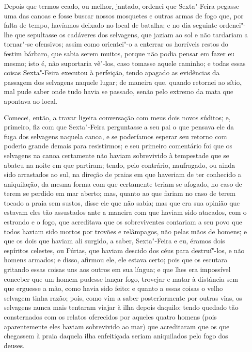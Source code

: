 Depois que termos ceado, ou melhor, jantado, ordenei que Sexta"-Feira
pegasse uma das canoas e fosse buscar nossos mosquetes e outras armas de
fogo que, por falta de tempo, havíamos deixado no local de batalha; e no
dia seguinte ordenei"-lhe que sepultasse os cadáveres dos selvagens, que
jaziam ao sol e não tardariam a tornar"-se ofensivos; assim como
orientei"-o a enterrar os horríveis restos do festim bárbaro, que sabia
serem muitos, porque não podia pensar em fazer eu mesmo; isto é, não
suportaria vê"-los, caso tomasse aquele caminho; e todas essas coisas
Sexta"-Feira executou à perfeição, tendo apagado as evidências da
passagem dos selvagens naquele lugar; de maneira que, quando retornei ao
sítio, mal pude saber onde tudo havia se passado, senão pelo extremo da
mata que apontava ao local.

Comecei, então, a travar ligeira conversação com meus dois novos
súditos; e, primeiro, fiz com que Sexta"-Feira perguntasse a seu pai o
que pensava ele da fuga dos selvagens naquela canoa, e se poderíamos
esperar seu retorno com poderio grande demais para resistirmos; e seu
primeiro comentário foi que os selvagens na canoa certamente não haviam
sobrevivido à tempestade que se abateu na noite em que partiram; tendo,
pelo contrário, naufragado, ou ainda sido arrastados ao sul, na direção
de praias em que haveriam de ter conhecido a aniquilação, da mesma forma
com que certamente teriam se afogado, no caso de terem se perdido em mar
aberto; mas, quanto ao que fariam no caso de terem tocado a praia sem
sustos, disse ele que não sabia; mas que era sua opinião que estavam
eles tão assustados ante a maneira com que haviam sido atacados, com o
estrondo e o fogo, que acreditava que os sobreviventes contariam a seu
povo que todos haviam sido mortos por trovões e relâmpagos, não pelas
mãos de homens; e que os dois que haviam ali surgido, a saber,
Sexta"-Feira e eu, éramos dois espíritos celestes, ou Fúrias, que haviam
descido dos céus para destruí"-los, e não homens armados; e disso,
afirmou ele, ele estava certo; pois que os escutara gritando essas
coisas uns aos outros em sua língua; e que lhes era impossível conceber
que um homem pudesse lançar fogo, trovejar e matar à distância sem que
erguesse a mão, como havia sido feito: e quanto a essas coisas o velho
selvagem tinha razão; pois, como vim a saber posteriormente por outras
vias, os selvagens nunca mais tentaram viajar à ilha depois daquilo;
tendo quedado tão consternados com os relatos oferecidos por aqueles
quatro homens (pois aparentemente eles haviam sobrevivido ao mar) que
acreditaram que os que chegassem à praia daquela ilha enfeitiçada seriam
aniquilados pelo fogo dos deuses.

